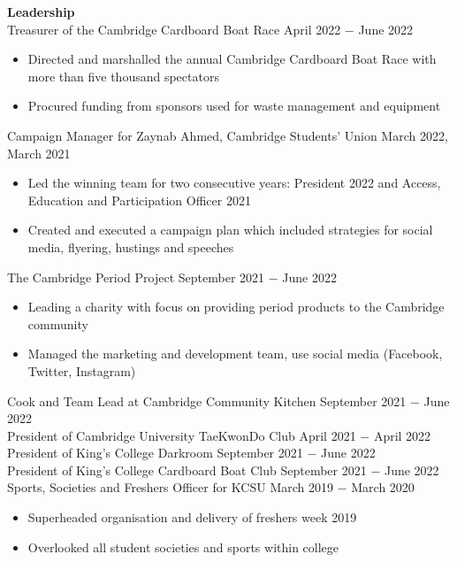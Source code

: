 \documentclass[8pt]{article}
\begin{document}
\textbf{Leadership}\\
Treasurer of the Cambridge Cardboard Boat Race \hfill April 2022 $-$ June 2022
\begin{itemize}
    \item Directed and marshalled the annual Cambridge Cardboard Boat Race with more than five thousand spectators
    \item Procured funding from sponsors used for waste management and equipment
\end{itemize}
Campaign Manager for Zaynab Ahmed, Cambridge Students' Union \hfill March 2022, March 2021
\begin{itemize}
    \item Led the winning team for two consecutive years: President 2022 and Access, Education and Participation Officer 2021
    \item Created and executed a campaign plan which included strategies for social media, flyering, hustings and speeches
\end{itemize}
The Cambridge Period Project \hfill  September 2021 $-$  June 2022
\begin{itemize}
    \item Leading a charity with focus on providing period products to the Cambridge community
    \item Managed the marketing and development team, use social media (Facebook, Twitter, Instagram)
\end{itemize}
Cook and Team Lead at Cambridge Community Kitchen \hfill September 2021 $-$ June 2022\\
President of Cambridge University TaeKwonDo Club \hfill April 2021 $-$ April 2022\\
President of King's College Darkroom \hfill September 2021 $-$ June 2022 \\ 
President of King's College Cardboard Boat Club \hfill September 2021 $-$ June 2022 \\
Sports, Societies and Freshers Officer for KCSU \hfill March 2019 $-$ March 2020
\begin{itemize}
    \item Superheaded organisation and delivery of freshers week 2019
    \item Overlooked all student societies and sports within college
\end{itemize} \medskip
\end{document}
